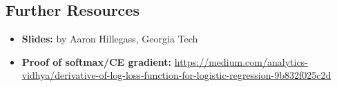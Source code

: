\documentclass[12pt]{article}
\begin{document}
\subsection{Further Resources}
\begin{itemize}
  \item \textbf{Slides:} by Aaron Hillegass, Georgia Tech
  \item \textbf{Proof of softmax/CE gradient:} \url{https://medium.com/analytics-vidhya/derivative-of-log-loss-function-for-logistic-regression-9b832f025c2d}
\end{itemize}
\end{document}

